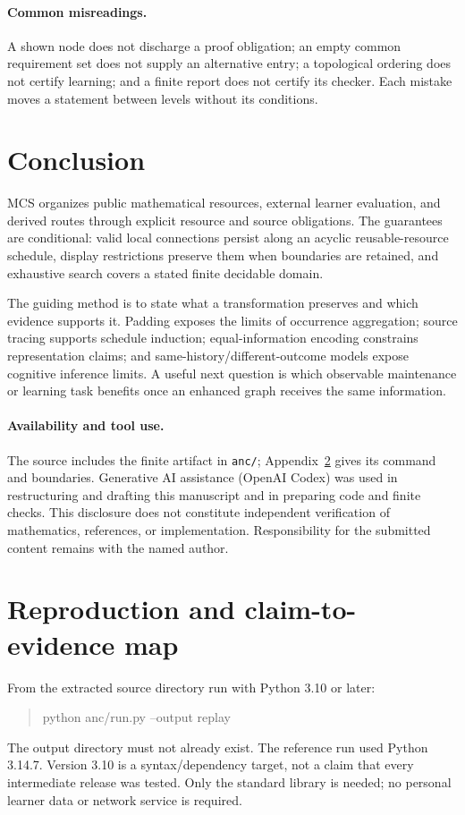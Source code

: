 \documentclass[11pt,a4paper]{article}
\theoremstyle{remark}
\begin{document}
\paragraph{Common misreadings.}
A shown node does not discharge a proof obligation; an empty common requirement
set does not supply an alternative entry; a topological ordering does not
certify learning; and a finite report does not certify its checker.
Each mistake moves a statement between levels without its conditions.

\section{Conclusion}
MCS organizes public mathematical resources, external learner evaluation, and
derived routes through explicit resource and source obligations.
The guarantees are conditional: valid local connections persist along an
acyclic reusable-resource schedule, display restrictions preserve them when
boundaries are retained, and exhaustive search covers a stated finite
decidable domain.

The guiding method is to state what a transformation preserves and which
evidence supports it. Padding exposes the limits of occurrence aggregation;
source tracing supports schedule induction; equal-information encoding
constrains representation claims; and same-history/different-outcome models
expose cognitive inference limits. A useful next question is which observable
maintenance or learning task benefits once an enhanced graph receives the
same information.

\paragraph{Availability and tool use.}
The source includes the finite artifact in \texttt{anc/};
Appendix~\ref{app:replay} gives its command and boundaries.
Generative AI assistance (OpenAI Codex) was used in restructuring and drafting
this manuscript and in preparing code and finite checks. This disclosure
does not constitute independent verification of mathematics, references, or
implementation. Responsibility for the submitted content remains with the
named author.

\appendix
\section{Reproduction and claim-to-evidence map}\label{app:replay}
From the extracted source directory run with Python 3.10 or later:
\begin{quote}\ttfamily
python anc/run.py --output replay
\end{quote}
The output directory must not already exist. The reference run used Python
3.14.7. Version 3.10 is a syntax/dependency target, not a claim that every
intermediate release was tested. Only the standard library is needed;
no personal learner data or network service is required.
\end{document}
